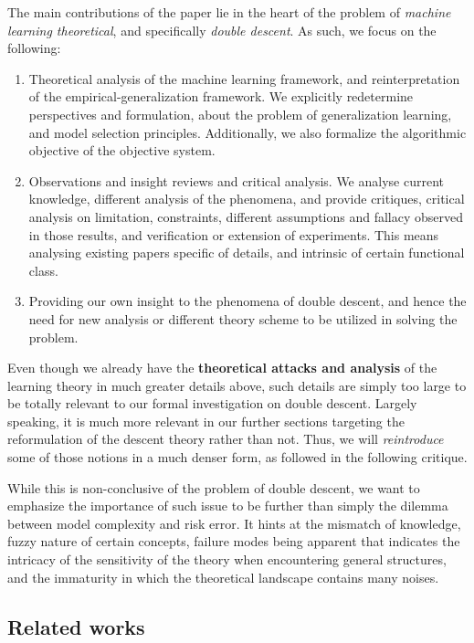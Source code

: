 The main contributions of the paper lie in the heart of the problem of \textit{machine learning theoretical}, and specifically \textit{double descent}. As such, we focus on the following:
\begin{enumerate}[itemsep=1pt,topsep=1pt]
    \item Theoretical analysis of the machine learning framework, and reinterpretation of the empirical-generalization framework. We explicitly redetermine perspectives and formulation, about the problem of generalization learning, and model selection principles. Additionally, we also formalize the algorithmic objective of the objective system. 
    \item Observations and insight reviews and critical analysis. We analyse current knowledge, different analysis of the phenomena, and provide critiques, critical analysis on limitation, constraints, different assumptions and fallacy observed in those results, and verification or extension of experiments. This means analysing existing papers specific of details, and intrinsic of certain functional class.
    \item Providing our own insight to the phenomena of double descent, and hence the need for new analysis or different theory scheme to be utilized in solving the problem. 
\end{enumerate}

Even though we already have the \textbf{theoretical attacks and analysis} of the learning theory in much greater details above, such details are simply too large to be totally relevant to our formal investigation on double descent. Largely speaking, it is much more relevant in our further sections targeting the reformulation of the descent theory rather than not. Thus, we will \textit{reintroduce} some of those notions in a much denser form, as followed in the following critique. 

While this is non-conclusive of the problem of double descent, we want to emphasize the importance of such issue to be further than simply the dilemma between model complexity and risk error. It hints at the mismatch of knowledge, fuzzy nature of certain concepts, failure modes being apparent that indicates the intricacy of the sensitivity of the theory when encountering general structures, and the immaturity in which the theoretical landscape contains many noises. 

\subsection{Related works}

